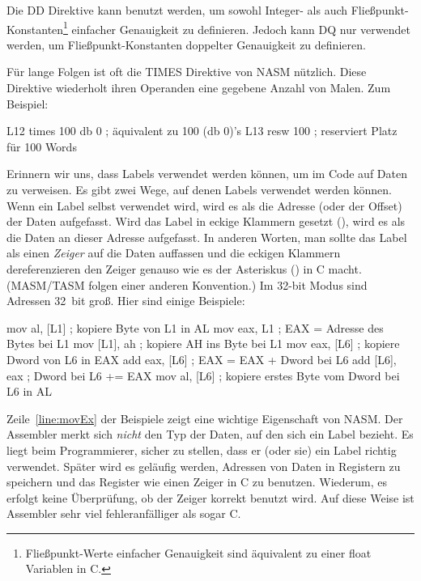 Die {\code DD}  Direktive kann benutzt werden,
um sowohl Integer- als auch Flie{\ss}punkt-Konstanten\footnote{
Flie{\ss}punkt-Werte einfacher Genauigkeit sind \"{a}quivalent zu einer
{\code float} Variablen in C.} einfacher Genauigkeit zu definieren.
Jedoch kann {\code DQ}  nur verwendet werden, um
Flie{\ss}punkt-Konstanten doppelter Genauigkeit zu definieren.

F\"{u}r lange Folgen ist oft die  {\code TIMES} 
Direktive von NASM n\"{u}tzlich. Diese Direktive wiederholt ihren
Operanden eine gegebene Anzahl von Malen. Zum Beispiel:
\begin{AsmCodeListing}[frame=none, numbers=left, firstnumber=last, commandchars=\\\{\}]
 L12  times  100 db 0       ; \"{a}quivalent zu 100 (db 0)'s
 L13  resw   100            ; reserviert Platz f\"{u}r 100 Words
\end{AsmCodeListing}

 Erinnern wir uns, dass Labels verwendet werden
k\"{o}nnen, um im Code auf Daten zu verweisen. Es gibt zwei Wege, auf
denen Labels verwendet werden k\"{o}nnen. Wenn ein Label selbst
verwendet wird, wird es als die Adresse (oder der Offset) der Daten
aufgefasst. Wird das Label in eckige Klammern gesetzt ({\code
[\,]}), wird es als die Daten an dieser Adresse aufgefasst. In
anderen Worten, man sollte das Label als einen \emph{Zeiger}
 auf die Daten auffassen und die eckigen Klammern
dereferenzieren den Zeiger genauso wie es der Asteriskus ({\code *})
in C macht. (MASM/TASM folgen einer anderen Konvention.) Im 32-bit
Modus sind Adressen 32~bit gro{\ss}. Hier sind einige Beispiele:
\begin{AsmCodeListing}[frame=none, numbers=left, firstnumber=last, commandchars=\\\{\}]
      mov    al, [L1]       ; kopiere Byte von L1 in AL
      mov    eax, L1        ; EAX = Adresse des Bytes bei L1
      mov    [L1], ah       ; kopiere AH ins Byte bei L1
      mov    eax, [L6]      ; kopiere Dword von L6 in EAX
      add    eax, [L6]      ; EAX = EAX + Dword bei L6
      add    [L6], eax      ; Dword bei L6 += EAX
      mov    al, [L6]       ; kopiere erstes Byte vom Dword bei L6 in AL  \label{line:movEx}
\end{AsmCodeListing}
Zeile~\ref{line:movEx} der Beispiele zeigt eine wichtige Eigenschaft
von NASM\@.  Der Assembler merkt sich
\emph{nicht} den Typ der Daten, auf den sich ein Label bezieht. Es
liegt beim Programmierer, sicher zu stellen, dass er (oder sie) ein
Label richtig verwendet. Sp\"{a}ter wird es gel\"{a}ufig werden, Adressen
von Daten in Registern zu speichern und das Register wie einen
Zeiger  in C zu benutzen. Wiederum, es erfolgt keine
\"{U}berpr\"{u}fung, ob der Zeiger korrekt benutzt wird. Auf diese Weise ist
Assembler sehr viel fehleranf\"{a}lliger als sogar C\@.

